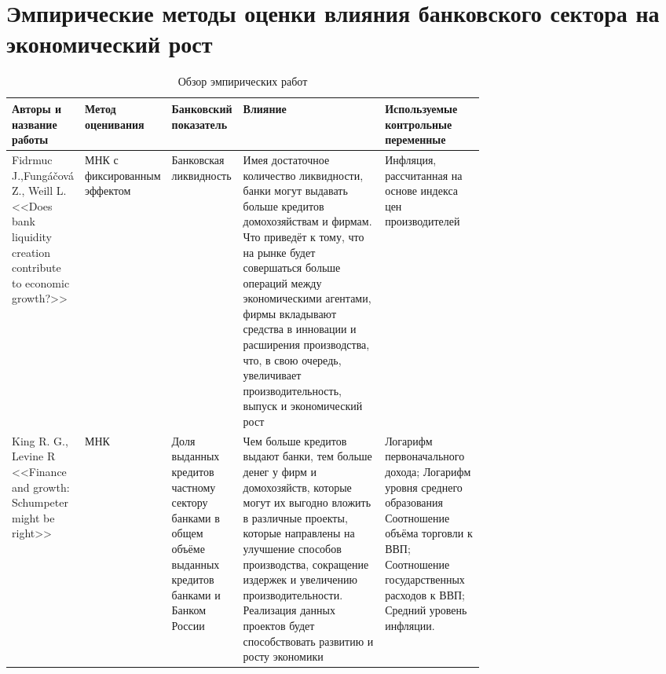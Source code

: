 \chapter{Эмпирические методы оценки влияния банковского сектора на экономический рост}

\begin{table}[H]
	\caption{Обзор эмпирических работ}\label{tab}
	\centering
	\begin{tabularx}{\textwidth}
		{|p{0.15\linewidth}|p{0.1\linewidth}|p{0.15\linewidth}|p{0.3\linewidth}|X|}\hline
		Авторы и \newline название работы & Метод оценивания & Банковский показатель & Влияние & Используемые контрольные переменные  \\\hline
		Fidrmuc J.,\newline Fungáčová Z., \newline Weill L.\newline <<Does bank liquidity creation contribute to economic growth?>> & МНК с фиксированным эффектом & Банковская ликвидность & Имея достаточное количество ликвидности, банки могут выдавать больше кредитов домохозяйствам и фирмам. Что приведёт к тому, что на рынке будет совершаться больше операций между экономическими агентами, фирмы вкладывают средства в инновации и расширения производства, что, в свою очередь, увеличивает производительность, выпуск и экономический рост & Инфляция, рассчитанная на основе индекса цен производителей\\\hline
		King R. G., Levine R  <<Finance and growth: Schumpeter might be right>>  &МНК& Доля выданных кредитов частному сектору банками в общем объёме выданных кредитов  банками и Банком России & Чем больше кредитов выдают банки, тем больше денег у фирм и домохозяйств, которые могут их выгодно вложить в различные проекты, которые направлены на улучшение способов производства, сокращение издержек и увеличению производительности. Реализация данных проектов будет способствовать развитию и росту экономики &  Логарифм первоначального дохода; \newline  Логарифм уровня среднего образования \newline Соотношение объёма торговли к ВВП;  \newline Соотношение государственных расходов к ВВП;  \newline Средний уровень инфляции. \\\hline
		
	\end{tabularx}
\end{table}

